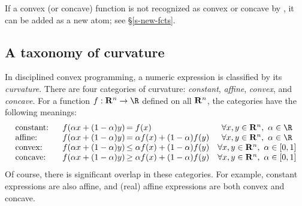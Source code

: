 \documentclass[12pt]{article}
\begin{document}
If a convex (or concave) function is not recognized as
convex or concave by \cvx, it can be added as a new atom;
see \S\ref{s-new-fcts}.



\subsection{A taxonomy of curvature}
\label{sec:taxonomy}

In disciplined convex programming, a numeric expression is classified
by its \emph{curvature}. There are four
categories of curvature:
\emph{constant}, \emph{affine}, \emph{convex}, and \emph{concave}.
For a function $f:\Rn\rightarrow\R$ defined on all $\mathbf{R}^{n}$,
the categories have the following meanings:
\begin{equation*}
\begin{array}{lc@{\,}lc}
\text{constant:}    & f(\alpha x + (1-\alpha)y) & = f(x) &
 \forall x,y\in\Rn,~\alpha\in\R\\
\text{affine:}      & f(\alpha x + (1-\alpha)y) & =
 \alpha f(x) + (1-\alpha) f(y) & \forall x,y\in\Rn,~\alpha\in\R \\
\text{convex:}  & f(\alpha x + (1-\alpha)y)
 & \leq \alpha f(x) + (1-\alpha) f(y) & \forall x,y\in\Rn,~\alpha\in [0,1] \\
\text{concave:}     \quad & f(\alpha x + (1-\alpha)y) & 
\geq \alpha f(x) + (1-\alpha) f(y) &
\forall x,y\in\Rn,~\alpha\in [0,1] 
\end{array}
\end{equation*}
Of course, there is significant
overlap in these categories. 
For example, constant expressions are also affine,
and (real) affine expressions are both convex and concave.
\end{document}
